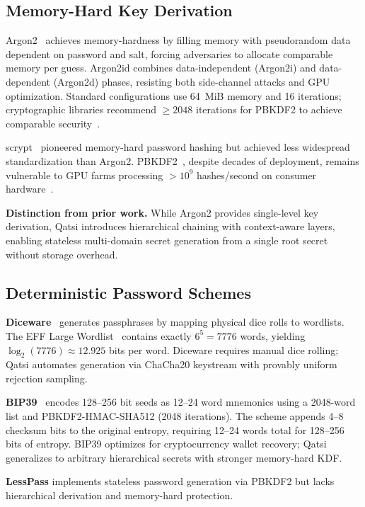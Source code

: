 \documentclass[11pt]{article}
\begin{document}
\subsection{Memory-Hard Key Derivation}

Argon2~\cite{rfc9106} achieves memory-hardness by filling memory with pseudorandom data dependent on password and salt, forcing adversaries to allocate comparable memory per guess. Argon2id combines data-independent (Argon2i) and data-dependent (Argon2d) phases, resisting both side-channel attacks and GPU optimization. Standard configurations use 64~MiB memory and 16 iterations; cryptographic libraries recommend $\geq 2048$ iterations for PBKDF2 to achieve comparable security~\cite{owasp-pbkdf2}.

scrypt~\cite{percival-scrypt} pioneered memory-hard password hashing but achieved less widespread standardization than Argon2. PBKDF2~\cite{rfc2898}, despite decades of deployment, remains vulnerable to GPU farms processing $>10^9$ hashes/second on consumer hardware~\cite{hashcat-bench}.

\textbf{Distinction from prior work.} While Argon2 provides single-level key derivation, Qatsi introduces hierarchical chaining with context-aware layers, enabling stateless multi-domain secret generation from a single root secret without storage overhead.

\subsection{Deterministic Password Schemes}

\textbf{Diceware}~\cite{diceware} generates passphrases by mapping physical dice rolls to wordlists. The EFF Large Wordlist~\cite{eff-wordlist} contains exactly $6^5 = 7776$ words, yielding $\log_2(7776) \approx 12.925$ bits per word. Diceware requires manual dice rolling; Qatsi automates generation via ChaCha20 keystream with provably uniform rejection sampling.

\textbf{BIP39}~\cite{bip39} encodes 128--256 bit seeds as 12--24 word mnemonics using a 2048-word list and PBKDF2-HMAC-SHA512 (2048 iterations). The scheme appends 4--8 checksum bits to the original entropy, requiring 12--24 words total for 128--256 bits of entropy. BIP39 optimizes for cryptocurrency wallet recovery; Qatsi generalizes to arbitrary hierarchical secrets with stronger memory-hard KDF.

\textbf{LessPass} implements stateless password generation via PBKDF2 but lacks hierarchical derivation and memory-hard protection.
\end{document}

